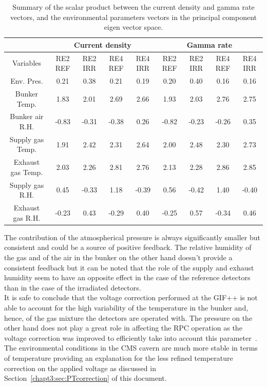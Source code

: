 	\begin{table}[H]
\centering
\scriptsize
\begin{tabular}{|c|c|c|c|c|c|c|c|c|}
\cline{2-9}
\multicolumn{1}{c|}{} & \multicolumn{4}{c|}{Current density} & \multicolumn{4}{c|}{Gamma rate}\\
\hline
Variables & RE2 REF & RE2 IRR & RE4 REF & RE4 IRR & RE2 REF & RE2 IRR & RE4 REF & RE4 IRR\\
\hline
Env. Pres. &  0.21 &  0.38 &  0.21 &  0.19 &  0.20 &  0.40 &  0.16 &  0.16\\
\hline
Bunker Temp. &  1.83 &  2.01 &  2.69 &  2.66 &  1.93 &  2.03 &  2.76 &  2.75\\
\hline
Bunker air R.H. & -0.83 & -0.31 & -0.38 &  0.26 & -0.82 & -0.23 & -0.26 &  0.35\\
\hline
Supply gas Temp. &  1.91 &  2.42 &  2.31 &  2.64 &  2.00 &  2.48 &  2.30 &  2.73\\
\hline
Exhaust gas Temp. &  2.03 &  2.26 &  2.81 &  2.76 &  2.13 &  2.28 &  2.86 &  2.85\\
\hline
Supply gas R.H. &  0.45 & -0.33 &  1.18 & -0.39 &  0.56 & -0.42 &  1.40 & -0.40\\
\hline
Exhaust gas R.H. & -0.23 &  0.43 & -0.29 &  0.40 & -0.25 &  0.57 & -0.34 &  0.46\\
\hline
\end{tabular}
\caption{\label{tab:Scalar-FullData} Summary of the scalar product between the current density and gamma rate vectors, and the environmental parameters vectors in the principal component eigen vector space.}
	\end{table}

\normalsize
	
	The contribution of the atmospherical pressure is always significantly smaller but consistent and could be a source of positive feedback. The relative humidity of the gas and of the air in the bunker on the other hand doesn't provide a consistent feedback but it can be noted that the role of the supply and exhaust humidity seem to have an opposite effect in the case of the reference detectors than in the case of the irradiated detectors.\\
	It is safe to conclude that the voltage correction performed at the GIF++ is not able to account for the high variability of the temperature in the bunker and, hence, of the gas mixture the detectors are operated with. The pressure on the other hand does not play a great role in affecting the RPC operation as the voltage correction was improved to efficiently take into account this parameter~\cite{ABBRESCIA2013}. The environmental conditions in the CMS cavern are much more stable in terms of temperature providing an explanation for the less refined temperature correction on the applied voltage as discussed in Section~\ref{chapt3:sec:PTcorrection} of this document.
	

